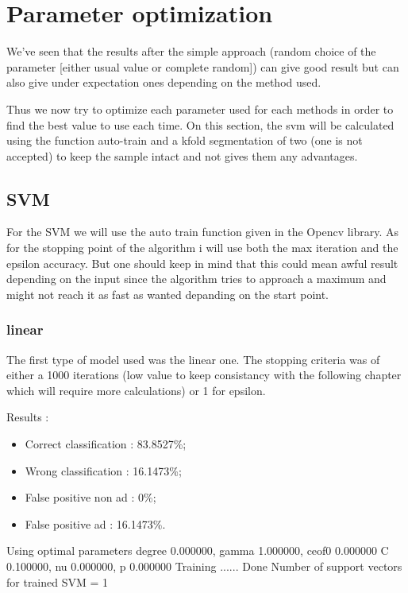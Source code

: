 \chapter{Parameter optimization}

We've seen that the results after the simple approach (random choice of the parameter [either usual value or complete random]) can give good result but can also give under expectation ones depending on the method used.

Thus we now try to optimize each parameter used for each methods in order to find the best value to use each time. On this section, the svm will be calculated using the function auto-train and a kfold segmentation of two (one is not accepted) to keep the sample intact and not gives them any advantages.

\section{SVM}

For the SVM we will use the auto train function given in the Opencv library. As for the stopping point of the algorithm i will use both the max iteration and the epsilon accuracy. But one should keep in mind that this could mean awful result depending on the input since the algorithm tries to approach a maximum and might not reach it as fast as wanted depanding on the start point.

\subsection{linear}

The first type of model used was the linear one. The stopping criteria was of either a 1000 iterations (low value to keep consistancy with the following chapter which will require more calculations) or 1 for epsilon.

Results :
\begin{itemize}
  \item Correct classification : 83.8527\%;
  \item Wrong classification : 16.1473\%;
  \item False positive non ad : 0\%;
  \item False positive ad : 16.1473\%.
\end{itemize}
Using optimal parameters degree 0.000000, gamma 1.000000, ceof0 0.000000
	 C 0.100000, nu 0.000000, p 0.000000
 Training ...... Done
Number of support vectors for trained SVM = 1



